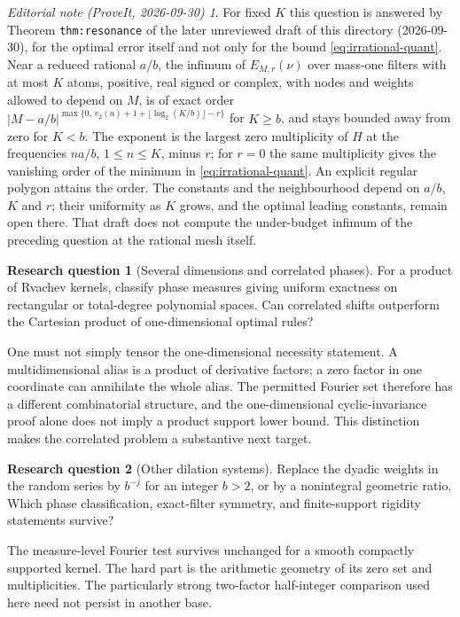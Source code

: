 \documentclass[11pt,a4paper]{article}
\numberwithin{equation}{section}
\theoremstyle{definition}
\newtheorem{question}{Research question}
\theoremstyle{remark}
\newtheorem*{ednote}{Editorial note (ProveIt, 2026-09-30)}
\begin{document}
\begin{ednote}
For fixed $K$ this question is answered by Theorem \texttt{thm:resonance}
of the later unreviewed draft  of this
directory (2026-09-30), for the optimal error itself and not only for the
bound \eqref{eq:irrational-quant}. Near a reduced rational $a/b$, the
infimum of $E_{M,r}(\nu)$ over mass-one filters with at most $K$ atoms,
positive, real signed or complex, with nodes and weights allowed to depend
on $M$, is of exact order
$|M-a/b|^{\max\{0,\,v_2(a)+1+\lfloor\log_2(K/b)\rfloor-r\}}$ for $K\ge b$,
and stays bounded away from zero for $K<b$. The exponent is the largest zero
multiplicity of $H$ at the frequencies $na/b$, $1\le n\le K$, minus $r$; for
$r=0$ the same multiplicity gives the vanishing order of the minimum in
\eqref{eq:irrational-quant}. An explicit regular polygon attains the order.
The constants and the neighbourhood depend on $a/b$, $K$ and $r$; their
uniformity as $K$ grows, and the optimal leading constants, remain open
there. That draft does not compute the under-budget infimum of the preceding
question at the rational mesh itself.
\end{ednote}

\begin{question}[Several dimensions and correlated phases]
For a product of Rvachev kernels, classify phase measures giving uniform
exactness on rectangular or total-degree polynomial spaces. Can correlated
shifts outperform the Cartesian product of one-dimensional optimal rules?
\end{question}
One must not simply tensor the one-dimensional necessity statement.
A multidimensional alias is a product of derivative factors; a zero
factor in one coordinate can annihilate the whole alias. The permitted
Fourier set therefore has a different combinatorial structure, and the
one-dimensional cyclic-invariance proof alone does not imply a product
support lower bound. This distinction makes the correlated problem a
substantive next target.

\begin{question}[Other dilation systems]
Replace the dyadic weights in the random series by $b^{-j}$ for an
integer $b>2$, or by a nonintegral geometric ratio. Which phase
classification, exact-filter symmetry, and finite-support rigidity
statements survive?
\end{question}
The measure-level Fourier test survives unchanged for a smooth compactly
supported kernel. The hard part is the arithmetic geometry of its zero
set and multiplicities. The particularly strong two-factor half-integer
comparison used here need not persist in another base.
\end{document}
